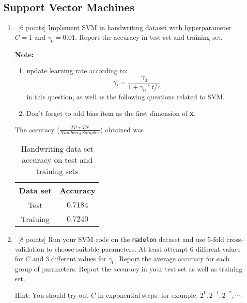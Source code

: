 \subsection{Support Vector Machines}
\begin{enumerate}
\item ~[6 points] Implement SVM in handwriting dataset with hyperparameter $C=1$ and $\gamma_0 = 0.01$. Report the accuracy in test set and training set. 

\textbf{Note:}
\begin{enumerate}
\item
 update learning rate according to:
$$\gamma_t = \frac{\gamma_0}{1 +\gamma_0 *t /c}$$
in this question, as well as the following questions related to SVM.
\item
Don't forget to add bias  item as the first dimension of \textbf{x}.
\end{enumerate}

The accuracy ($\frac{TP+TN}{Number of Samples}$) obtained was

    \begin{table}[H]
    \centering
    \begin{tabular}{| c | c |}
      \hline
      Data set & Accuracy  \\
      \hline
      Test & $0.7184$\\
      \hline
      Training & $0.7240$\\
      \hline
    \end{tabular}
    \caption{Handwriting data set accuracy on test and training sets}
  \end{table}    

\item ~[8 points] Run your SVM code on the {\tt madelon} dataset and
  use 5-fold cross-validation to choose suitable parameters. At least
  attempt 6 different values for $C$ and 3 different values for
  $\gamma_0$. Report the average accuracy for each group of parameters.
  Report the accuracy in your test set as well as training set.

  Hint: You should try out $C$ in exponential steps, for example,
  $2^1, 2^{-1}, 2^{-2}, \cdots$.


\end{enumerate}
